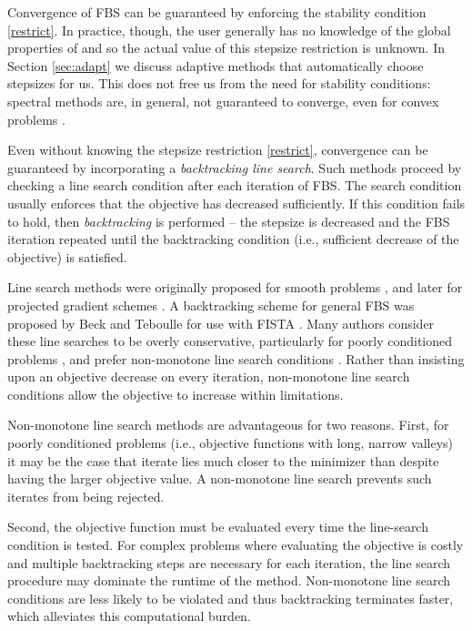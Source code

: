 \documentclass{amsart}
\theoremstyle{definition}
\begin{document}
Convergence of FBS can be guaranteed by enforcing the stability condition \eqref{restrict}.  In practice, though, the user generally has no knowledge of the global properties of  and so the actual value of this stepsize restriction is unknown.  In Section \ref{sec:adapt} we discuss adaptive methods that automatically choose stepsizes for us.  This does not free us from the need for stability conditions: spectral methods are, in general,  not guaranteed to converge, even for convex problems \cite{BMR00}.  

Even without knowing the stepsize restriction \eqref{restrict},  convergence can be guaranteed by incorporating a \emph{backtracking line search}.   Such methods proceed by checking a line search condition after each iteration of FBS.   The search condition usually enforces that the objective has decreased sufficiently. If this condition fails to hold, then {\em backtracking} is performed -- the stepsize is decreased and the FBS iteration repeated until the backtracking condition (i.e., sufficient decrease of the objective) is satisfied. 
 
Line search methods were originally proposed for smooth problems \cite{BMDIC95}, and later for projected gradient schemes \cite{KM96,BMR00}.  A backtracking  scheme for general FBS was proposed by Beck and Teboulle for use with FISTA \cite{BT09}.  
  Many authors consider these line searches to be overly conservative, particularly for poorly conditioned problems \cite{BMR00}, and prefer non-monotone line search conditions \cite{GLL86,ZH04}.  Rather than insisting upon an objective decrease on every iteration, non-monotone line search conditions allow the objective to increase within limitations.
  
    Non-monotone line search methods are advantageous for two reasons. First, for poorly conditioned problems (i.e., objective functions with long, narrow valleys) it may be the case that iterate   lies much closer to the minimizer than  despite  having the larger objective value. A non-monotone line search prevents such iterates from being rejected.  


Second, the objective function must be evaluated every time the line-search condition is tested.  For complex problems where evaluating the objective is costly and multiple backtracking steps are necessary for each iteration,  the line search procedure may dominate the runtime of the method.  Non-monotone line search conditions are less likely to be violated and thus backtracking terminates faster, which alleviates this computational burden.
\end{document}
